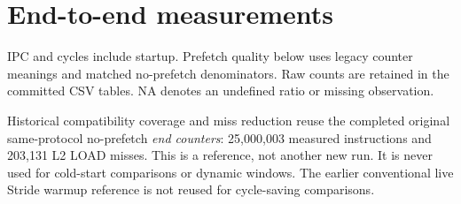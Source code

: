 \documentclass[10pt]{article}
\begin{document}
\section{End-to-end measurements}

IPC and cycles include startup. Prefetch quality below uses legacy counter meanings and matched no-prefetch denominators. Raw counts are retained in the committed CSV tables. NA denotes an undefined ratio or missing observation.

Historical compatibility coverage and miss reduction reuse the completed original same-protocol no-prefetch \emph{end counters}: 25,000,003 measured instructions and 203,131 L2 LOAD misses. This is a reference, not another new run. It is never used for cold-start comparisons or dynamic windows. The earlier conventional live Stride warmup reference is not reused for cycle-saving comparisons.
\end{document}
